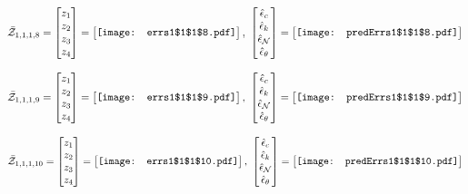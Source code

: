 \documentclass[12pt]{article}
\begin{document}
\begin{gather*}
\bar{\mathcal{Z}}_{1,1,1,8}=\begin{bmatrix}
z_1\\
z_2\\
z_3\\
z_4
 \end{bmatrix}= \begin{bmatrix}
\vcenter{\hbox{\texttt{[image: errs1\$1\$1\$8.pdf]}}}
 \end{bmatrix},\,\, \begin{bmatrix}
\hat{\epsilon}_c\\\hat{\epsilon}_k\\\hat{\epsilon}_\mathcal{N}\\\hat{\epsilon}_\theta
 \end{bmatrix}=\begin{bmatrix}
\vcenter{\hbox{\texttt{[image: predErrs1\$1\$1\$8.pdf]}}}
 \end{bmatrix}
\end{gather*}



\begin{gather*}
\bar{\mathcal{Z}}_{1,1,1,9}=\begin{bmatrix}
z_1\\
z_2\\
z_3\\
z_4
 \end{bmatrix}= \begin{bmatrix}
\vcenter{\hbox{\texttt{[image: errs1\$1\$1\$9.pdf]}}}
 \end{bmatrix},\,\, \begin{bmatrix}
\hat{\epsilon}_c\\\hat{\epsilon}_k\\\hat{\epsilon}_\mathcal{N}\\\hat{\epsilon}_\theta
 \end{bmatrix}=\begin{bmatrix}
\vcenter{\hbox{\texttt{[image: predErrs1\$1\$1\$9.pdf]}}}
 \end{bmatrix}
\end{gather*}

\begin{gather*}
\bar{\mathcal{Z}}_{1,1,1,10}=\begin{bmatrix}
z_1\\
z_2\\
z_3\\
z_4
 \end{bmatrix}= \begin{bmatrix}
\vcenter{\hbox{\texttt{[image: errs1\$1\$1\$10.pdf]}}}
 \end{bmatrix},\,\, \begin{bmatrix}
\hat{\epsilon}_c\\\hat{\epsilon}_k\\\hat{\epsilon}_\mathcal{N}\\\hat{\epsilon}_\theta
 \end{bmatrix}=\begin{bmatrix}
\vcenter{\hbox{\texttt{[image: predErrs1\$1\$1\$10.pdf]}}}
 \end{bmatrix}
\end{gather*}
\end{document}
